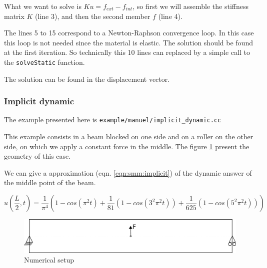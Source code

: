 \documentclass[a4paper,11pt]{book}
\newcommand{\code}[1]{{\tt{#1}}}
\begin{document}
What we want to solve is $Ku = f_{ext} - f_{int}$, so first we will assemble the
stiffness matrix $K$ (line 3), and then the second member $f$ (line 4).

The lines 5 to 15 correspond  to a Newton-Raphson convergence loop. In this case
this loop  is not needed since the  material is elastic. The  solution should be
found at  the first iteration.  So technically this  10 lines can replaced  by a
simple call to the \code{solveStatic} function.

The solution can be found in the displacement vector.


\subsubsection{Implicit dynamic}
The example presented here is \code{example/manuel/implicit\_dynamic.cc}

This example consists in a beam blocked on one side and on a roller on the other
side,  on  which   we  apply  a  constant  force  in   the  middle.  The  figure
\ref{fig:smm:implicit:dynamic} present the geometry of this case.

We can give a approximation  (eqn. \ref{eqn:smm:implicit}) of the dynamic answer
of the middle point of the beam.

\begin{equation}
  u(\frac{L}{2}, t) = \frac{1}{\pi^4} (1 - cos(\pi^2 t) +
  \frac{1}{81}(1 - cos(3^2 \pi^2 t)) +
  \frac{1}{625}(1 - cos(5^2 \pi^2 t)))
\end{equation}
\label{eqn:smm:implicit}

\begin{figure}[!htb]
  \centering
  \includegraphics[scale=.6]{figures/implicit_dynamic}
  \caption{Numerical setup}
  \label{fig:smm:implicit:dynamic}
\end{figure}
\end{document}
